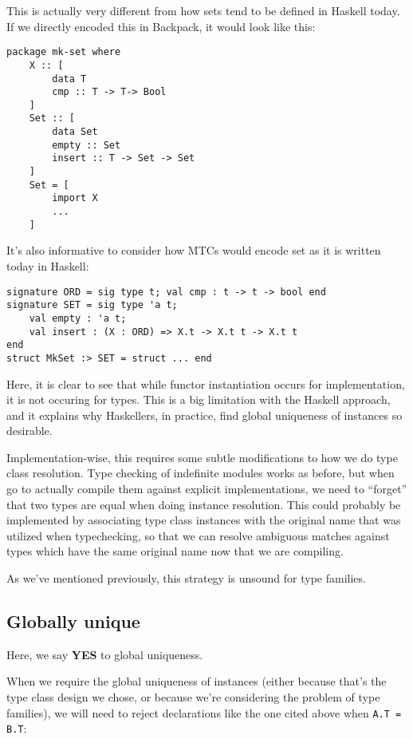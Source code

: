 \documentclass{article}
\begin{document}
This is actually very different from how sets tend to be defined in
Haskell today.  If we directly encoded this in Backpack, it would
look like this:

\begin{verbatim}
package mk-set where
    X :: [
        data T
        cmp :: T -> T-> Bool
    ]
    Set :: [
        data Set
        empty :: Set
        insert :: T -> Set -> Set
    ]
    Set = [
        import X
        ...
    ]
\end{verbatim}

It's also informative to consider how MTCs would encode set as it is written
today in Haskell:

\begin{verbatim}
signature ORD = sig type t; val cmp : t -> t -> bool end
signature SET = sig type 'a t;
    val empty : 'a t;
    val insert : (X : ORD) => X.t -> X.t t -> X.t t
end
struct MkSet :> SET = struct ... end
\end{verbatim}

Here, it is clear to see that while functor instantiation occurs for
implementation, it is not occuring for types.  This is a big limitation
with the Haskell approach, and it explains why Haskellers, in practice,
find global uniqueness of instances so desirable.

Implementation-wise, this requires some subtle modifications to how we
do type class resolution.  Type checking of indefinite modules works as
before, but when go to actually compile them against explicit
implementations, we need to ``forget'' that two types are equal when
doing instance resolution.  This could probably be implemented by
associating type class instances with the original name that was
utilized when typechecking, so that we can resolve ambiguous matches
against types which have the same original name now that we are
compiling.

As we've mentioned previously, this strategy is unsound for type families.

\subsection{Globally unique}

Here, we say \textbf{YES} to global uniqueness.

When we require the global uniqueness of instances (either because
that's the type class design we chose, or because we're considering
the problem of type families), we will need to reject declarations like the
one cited above when \verb|A.T = B.T|:
\end{document}
